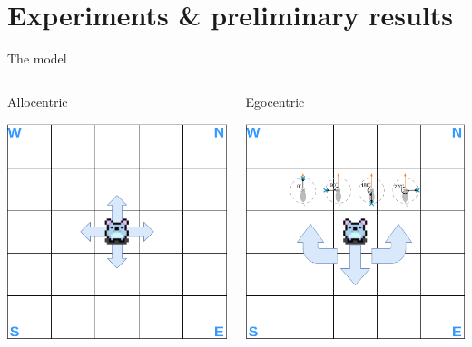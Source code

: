 \documentclass[bigger]{beamer}
\begin{document}
\section{Experiments \& preliminary results}
\label{sec:org56f20f3}
\begin{frame}[label={sec:orgec17ca5}]{The model}
\begin{columns}
\begin{column}{0.5\columnwidth}
\center
Allocentric
\begin{center}
\includegraphics[width=\textwidth]{img/RL_environment-Allo.drawio.png}
\end{center}
\end{column}
\begin{column}{0.5\columnwidth}
\center
Egocentric
\begin{center}
\includegraphics[width=\textwidth]{img/RL_environment-Ego.drawio.png}

\end{center}
\end{column}
\end{columns}
\end{frame}
\end{document}
